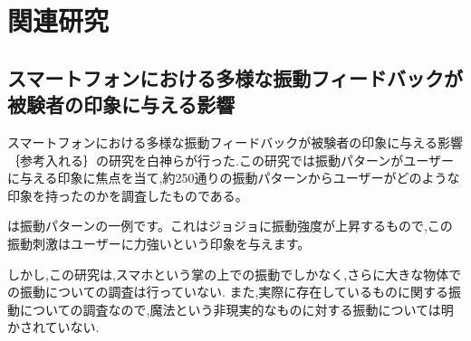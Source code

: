 \chapter{関連研究}

\begin{comment}
\begin{textblock}{6}(14.5, 22)
  ←図のキャプションは図の下
\end{textblock}
\end{comment}

% 


\section{スマートフォンにおける多様な振動フィードバックが被験者の印象に与える影響}
スマートフォンにおける多様な振動フィードバックが被験者の印象に与える影響｛参考入れる｝の研究を白神らが行った.この研究では振動パターンがユーザーに与える印象に焦点を当て,約250通りの振動パターンからユーザーがどのような印象を持ったのかを調査したものである。

は振動パターンの一例です。これはジョジョに振動強度が上昇するもので,この振動刺激はユーザーに力強いという印象を与えます。



しかし,この研究は,スマホという掌の上での振動でしかなく,さらに大きな物体での振動についての調査は行っていない.
また,実際に存在しているものに関する振動についての調査なので,魔法という非現実的なものに対する振動については明かされていない.





\begin{comment}
  \begin{textblock}{6.5}(1, 18)
    \noindent
    【16,18】図番号は章ごとの通し番号で抜けがない
  \end{textblock}
  
  \begin{textblock}{7}(13, 22)
    ←本文で説明がない図は載せない
  \end{textblock}
\end{comment}
